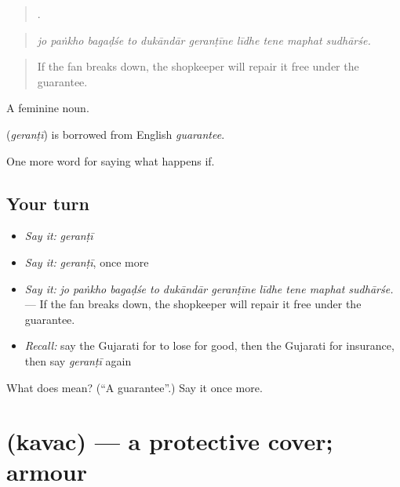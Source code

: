 \begin{quote}
         .
\end{quote}

\begin{quote}
\emph{jo paṅkho bagaḍśe to dukāndār geranṭīne līdhe tene maphat sudhārśe.}
\end{quote}

\begin{quote}
If the fan breaks down, the shopkeeper will repair it free under the guarantee.
\end{quote}

A feminine noun.

\begin{cousinweb}
\textbf{} (\emph{geranṭī}) is borrowed from English \emph{guarantee}.
\end{cousinweb}

\begin{grammarlens}[title={What you've built}]
One more word for saying what happens if.
\end{grammarlens}

\subsection*{Your turn}
\begin{itemize}
\raggedright
  \item \emph{Say it:} \emph{geranṭī}
  \item \emph{Say it:} \emph{geranṭī}, once more
  \item \emph{Say it:} \emph{jo paṅkho bagaḍśe to dukāndār geranṭīne līdhe tene maphat sudhārśe.} — If the fan breaks down, the shopkeeper will repair it free under the guarantee.
  \item \emph{Recall:} say the Gujarati for to lose for good, then the Gujarati for insurance, then say \emph{geranṭī} again
\end{itemize}

\begin{tcolorbox}[breakable,colback=teal!4,colframe=teal!35!black,title={Before you move on}]
What does  mean? (\textquotedblleft{}A guarantee\textquotedblright{}.) Say it once more.
\end{tcolorbox}
\section[\texorpdfstring{\gu{કવચ} (kavac)}{કવચ (kavac)}]{ (kavac) — a protective cover; armour}

